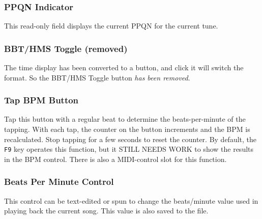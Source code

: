 \begin{comment}
   \itempar{Toggle Tracks}{pattern!toggle tracks}
   \index{pattern!toggle tracks}
   This button changes the status of all of the
   \textsl{playing} tracks, reversing the
   mute status of each pattern that is playing.
   The next click will then unmute only those tracks.
   Because it can be confusing, this button is disabled (not shown
   in the figure) in Song mode.

   LATER:  Describe
   \texttt{Ctrl-M},
   \texttt{Ctrl-U}, and
   \texttt{Ctrl-T}.

\end{comment}

\subsubsection{PPQN Indicator}
\label{subsubsec:introduction_ppqn_indicator}

   This read-only field displays the current PPQN for the current tune.


\subsubsection{BBT/HMS Toggle (removed)}
\label{subsubsec:introduction_time_format_toggle_button}

   The time display has been converted to a button, and click it will
   switch the format. So the BBT/HMS Toggle button
   \textsl{has been removed}.


\subsubsection{Tap BPM Button}
\label{subsubsec:introduction_tap_bpm_button}

   Tap this button with a regular beat to determine the beats-per-minute of the
   tapping.  With each tap, the counter on the button increments and the BPM is
   recalculated.  Stop tapping for a few seconds to reset the counter.
   By default, the \texttt{F9} key operates this function, but it
   STILL NEEDS WORK to show the results in the BPM control.
   There is also a MIDI-control slot for this function.

\subsubsection{Beats Per Minute Control}
\label{subsubsec:introduction_bpm_control}

   This control can be text-edited or spun to change the beats/minute value
   used in playing back the current song.  This value is also saved to the
   file.

